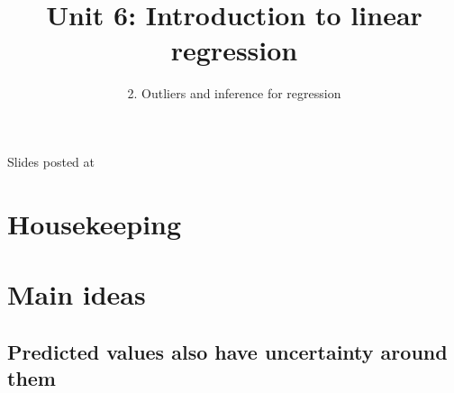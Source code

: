 \documentclass[slidestop,compress,mathserif,12pt,t,professionalfonts,xcolor=table]{beamer}
\title{Unit 6: Introduction to linear regression}
\subtitle{2. Outliers and inference for regression}
\author{\CourseName}
\date{}
\institute{\InstituteName}
\begin{document}



\begin{frame}[plain]

\titlepage

\vfill

{\scriptsize {} \hfill Slides posted at  \webURL{\CourseSite}}

\addtocounter{framenumber}{-1} 

\end{frame}


\section{Housekeeping}


%
%
%
%
%
%
%


\section{Main ideas}


\subsection{Predicted values also have uncertainty around them}
\label{mi2}
\end{document}
